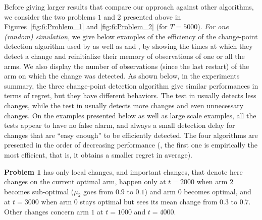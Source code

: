 Before giving larger results that compare our approach against other algorithms, we consider the two problems $1$ and $2$ presented above in Figures~\ref{fig:6:Problem_1} and \ref{fig:6:Problem_2} (for $T=5000$).
\emph{For one (random) simulation}, we give below examples of the efficiency of the change-point detection algorithm used by \GLRklUCB{} as well as \CUSUMklUCB{} and \MklUCB,
by showing the times at which they detect a change and reinitialize their memory of observations of one or all the arms.
We also display the number of observations (since the last restart) of the arm on which the change was detected.
As shown below, in the experiments summary, the three change-point detection algorithm give similar performances in terms of regret, but they have different behaviors.
The test in \MUCB{} usually detects less changes, while the test in \CUSUMUCB{} usually detects more changes and even unnecessary changes.
%
On the examples presented below as well as large scale examples, all the tests appear to have no false alarm, and always a small detection delay for changes that are ``easy enough'' to be efficiently detected.
The four algorithms are presented in the order of decreasing performance (\ie, the first one is empirically the most efficient, that is, it obtains a smaller regret in average).



\textbf{Problem $\bm{1}$} has only local changes, and important changes, that denote here changes on the current optimal arm, happen only at $t=2000$ when arm $2$ becomes sub-optimal ($\mu_2$ goes from $0.9$ to $0.1$) and arm $0$ becomes optimal, and at $t=3000$ when arm $0$ stays optimal but sees its mean change from $0.3$ to $0.7$.
Other changes concern arm $1$ at $t=1000$ and $t=4000$.

